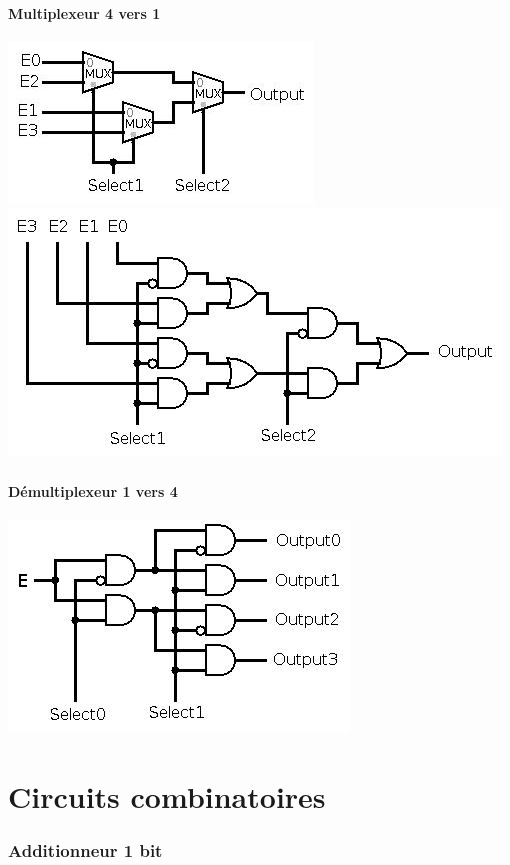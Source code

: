 \documentclass[10pt,a4paper]{article}
\begin{document}
\subsection{Multiplexeur 4 vers 1}
\includegraphics[scale=0.5]{mult4vers1_1.jpg}\\

\includegraphics[scale=0.4]{mult4vers1_2.jpg}  

\subsection{Démultiplexeur 1 vers 4}
\includegraphics[scale=0.5]{demult1vers4.jpg} 

\newpage
\part{Circuits combinatoires}
\section{Additionneur 1 bit}
\end{document}
